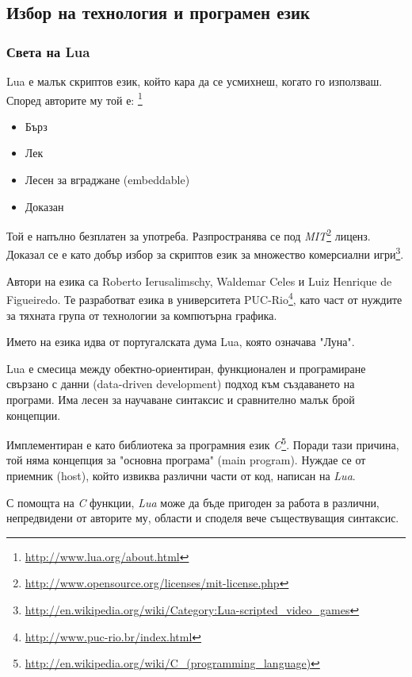 	\subsection{Избор на технология и програмен език}
		\subsubsection{Света на Lua}
		
			Lua е малък скриптов език, който кара да се усмихнеш, когато го използваш. 
			Според авторите му той е: \footnote{\url{http://www.lua.org/about.html}} 
			
			\begin{itemize}
				\item Бърз
				\item Лек
				\item Лесен за вграджане (embeddable)
				\item Доказан
			\end{itemize}
			
			Той е напълно безплатен за употреба. Разпространява се под 
			\emph{MIT}\footnote{\url{http://www.opensource.org/licenses/mit-license.php}} лиценз. 
			Доказал се е като добър избор за скриптов език за множество комерсиални 
			игри\footnote{\url{http://en.wikipedia.org/wiki/Category:Lua-scripted_video_games}}.
			
			Автори на езика са Roberto Ierusalimschy, Waldemar Celes и Luiz Henrique de Figueiredo. Те разработват езика в
			университета PUC-Rio\footnote{\url{http://www.puc-rio.br/index.html}}, като част от нуждите за тяхната група
			от технологии за компютърна графика. 
			
			Името на езика идва от португалската дума Lua, която означава "Луна".
			
			Lua е смесица между обектно-ориентиран, функционален и програмиране свързано с данни (data-driven development)
			подход към създаването на програми. Има лесен за научаване синтаксис и сравнително малък брой концепции. 
			
			Имплементиран е като библиотека за програмния език \emph{C}\footnote{\url{http://en.wikipedia.org/wiki/C_(programming_language)}}. 
			Поради тази причина, той няма концепция за "основна програма" (main program). Нуждае се от приемник (host), който извиква различни
			части от код, написан на \emph{Lua}.
			
			С помощта на \emph{C} функции, \emph{Lua} може да бъде пригоден за работа в различни, непредвидени от авторите му,
			области и споделя вече съществуващия синтаксис.
			
